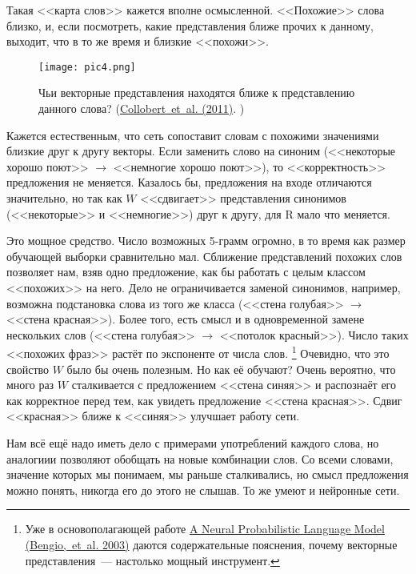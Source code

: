 \documentclass[a4paper,12pt]{article}
\begin{document}
Такая <<карта слов>> кажется вполне осмысленной. <<Похожие>> слова близко, и, если посмотреть, какие представления ближе прочих к данному,  выходит, что в то же время и близкие <<похожи>>.

\begin{figure}[t]
\begin{center}
\texttt{[image: pic4.png]}
\caption{Чьи векторные представления находятся ближе к представлению данного слова? (\href{http://arxiv.org/pdf/1103.0398v1.pdf}{Collobert~et~al. (2011)}. ) }
\end{center}
\end{figure}

Кажется естественным, что сеть сопоставит словам с похожими значениями близкие друг к другу векторы. Если заменить слово на синоним (<<некоторые хорошо поют>> $\rightarrow$ <<немногие хорошо поют>>), то <<корректность>> предложения не меняется. Казалось бы, предложения на входе отличаются значительно, но так как $W$ <<сдвигает>> представления синонимов (<<некоторые>> и <<немногие>>) друг к другу, для R мало что меняется.

Это мощное средство. Число возможных 5-грамм огромно, в то время как размер обучающей выборки сравнительно мал. Сближение представлений похожих слов позволяет нам, взяв одно предложение, как бы работать с целым классом <<похожих>>  на него. Дело не ограничивается заменой синонимов, например, возможна подстановка слова из того же класса (<<стена голубая>> $\rightarrow$ <<стена красная>>). Более того, есть смысл и в одновременной замене нескольких слов (<<стена голубая>> $\rightarrow$ <<потолок красный>>). Число таких <<похожих фраз>> растёт по экспоненте от числа слов. \footnote{Уже в основополагающей работе \href{http://machinelearning.wustl.edu/mlpapers/paper_files/BengioDVJ03.pdf}{A Neural Probabilistic Language Model (Bengio,~et~al. 2003)} даются содержательные пояснения, почему векторные представления~--- настолько мощный инструмент.}
Очевидно, что это свойство $W$ было бы очень полезным. Но как её обучают? Очень вероятно, что много раз $W$ сталкивается с предложением <<стена синяя>> и распознаёт его как корректное перед тем, как увидеть предложение <<стена красная>>. Сдвиг <<красная>> ближе к <<синяя>> улучшает работу сети.

Нам всё ещё надо иметь дело с примерами употреблений каждого слова, но аналогиии позволяют обобщать на новые комбинации слов. Со всеми словами, значение которых мы понимаем, мы раньше сталкивались, но смысл предложения можно понять, никогда его до этого не слышав. То же умеют и нейронные сети.
\end{document}
